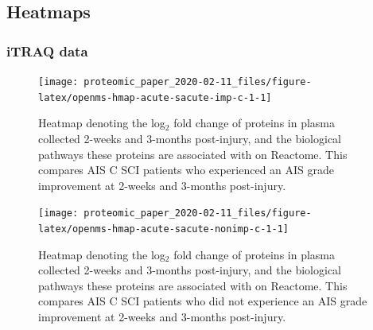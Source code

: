 \documentclass[9pt,lineno]{elife}
\begin{document}
\hypertarget{sup-heatmaps}{%
\subsection{Heatmaps}\label{sup-heatmaps}}

\hypertarget{itraq-data}{%
\subsubsection{iTRAQ data}\label{itraq-data}}

\begin{landscape}



\begin{figure}

{\centering \texttt{[image: proteomic\_paper\_2020-02-11\_files/figure-latex/openms-hmap-acute-sacute-imp-c-1-1]} 

}

\caption[Heatmap - iTRAQ - Acute C Improvers VS Subacute Improvers]{Heatmap denoting the log\(_2\) fold change of proteins in plasma collected 2-weeks and 3-months post-injury, and the biological pathways these proteins are associated with on Reactome. This compares AIS C SCI patients who experienced an AIS grade improvement at 2-weeks and 3-months post-injury.}\label{fig:openms-hmap-acute-sacute-imp-c-1}
\end{figure}

\end{landscape}
\begin{landscape}



\begin{figure}

{\centering \texttt{[image: proteomic\_paper\_2020-02-11\_files/figure-latex/openms-hmap-acute-sacute-nonimp-c-1-1]} 

}

\caption[Heatmap - iTRAQ - Acute Non-Improvers VS Subacute Non-Improvers]{Heatmap denoting the log\(_2\) fold change of proteins in plasma collected 2-weeks and 3-months post-injury, and the biological pathways these proteins are associated with on Reactome. This compares AIS C SCI patients who did not experience an AIS grade improvement at 2-weeks and 3-months post-injury.}\label{fig:openms-hmap-acute-sacute-nonimp-c-1}
\end{figure}

\end{landscape}
\end{document}
